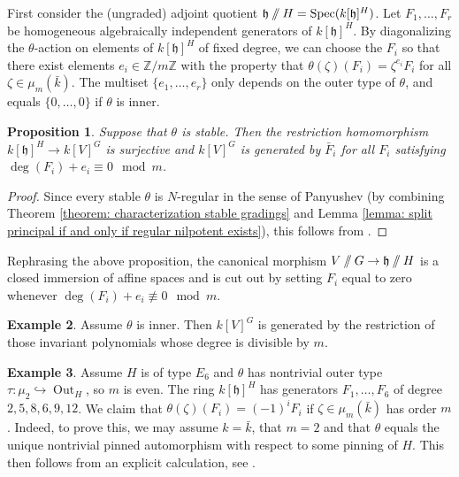 \documentclass{article} %
\newtheorem{proposition}{Proposition}[section]
\numberwithin{equation}{section}
\theoremstyle{definition}
\newtheorem{example}[proposition]{Example}
\DeclareMathOperator{\Out}{Out}
\DeclareMathOperator{\Spec}{Spec}
\newcommand{\GIT}{\mathbin{/\mkern-6mu/}}
\newcommand{\Z}{\mathbb{Z}}
\newcommand{\frakh}{\mathfrak h}
\begin{document}
First consider the (ungraded) adjoint quotient $\frakh \GIT H = \Spec(k[\frakh]^H)$.
Let $F_1, \dots, F_{r}$ be homogeneous algebraically independent generators of $k[\frakh]^H$.
By diagonalizing the $\theta$-action on elements of $k[\frakh]^H$ of fixed degree, we can choose the $F_i$ so that there exist elements $e_i\in \Z/m\Z$ with the property that $\theta(\zeta)(F_i) = \zeta^{e_i} F_i$ for all $\zeta\in \mu_m(\bar{k})$.
The multiset $\{e_1,\dots, e_{r}\}$ only depends on the outer type of $\theta$, and equals $\{0, \dots, 0\}$ if $\theta$ is inner.

\begin{proposition}\label{proposition: invariant polys panyushev}
    Suppose that $\theta$ is stable.
    Then the restriction homomorphism $k[\frakh]^H \rightarrow k[V]^G$ is surjective and $k[V]^G$ is generated by $\bar{F}_i$ for all $F_i$ satisfying $\deg(F_i) +e_i\equiv 0 \mod m$.
\end{proposition}
\begin{proof}
    Since every stable $\theta$ is $N$-regular in the sense of Panyushev (by combining Theorem \ref{theorem: characterization stable gradings} and Lemma \ref{lemma: split principal if and only if regular nilpotent exists}), this follows from \cite[Theorem 3.5(i)]{Panyushev-Invarianttheorythetagroups}.
\end{proof}

Rephrasing the above proposition, the canonical morphism $V\GIT G\rightarrow \frakh \GIT H$ is a closed immersion of affine spaces and is cut out by setting $F_i$ equal to zero whenever $\deg(F_i) +e_i\not\equiv 0 \mod m$.

\begin{example}
    Assume $\theta$ is inner.
    Then $k[V]^G$ is generated by the restriction of those invariant polynomials whose degree is divisible by $m$.
\end{example}

\begin{example}
    Assume $H$ is of type $E_6$ and $\theta$ has nontrivial outer type $\tau\colon \mu_2\hookrightarrow \Out_H$, so $m$ is even.
    The ring $k[\frakh]^H$ has generators $F_1, \dots, F_6$ of degree $2,5,8,6,9,12$.
    We claim that $\theta(\zeta)(F_i) = (-1)^iF_i$ if $\zeta\in \mu_m(\bar{k})$ has order $m$.
    Indeed, to prove this, we may assume $k = \bar{k}$, that $m=2$ and that $\theta$ equals the unique nontrivial pinned automorphism with respect to some pinning of $H$.
    This then follows from an explicit calculation, see \cite[Proposition 2.5(2)]{Laga-F4paper}.
\end{example}
\end{document}
